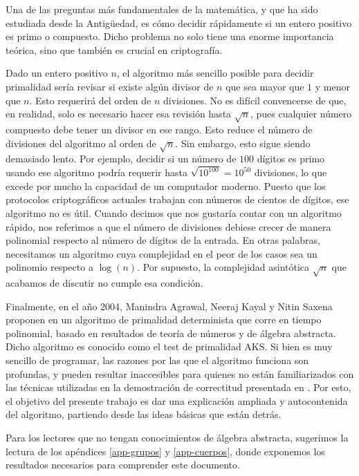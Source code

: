 Una de las preguntas más fundamentales de la matemática, y que ha sido estudiada desde la Antigüedad, es cómo decidir rápidamente si un entero positivo es primo o compuesto. Dicho problema no solo tiene una enorme importancia teórica, sino que también es crucial en criptografía.

Dado un entero positivo $n$, el algoritmo más sencillo posible para decidir primalidad sería revisar si existe algún divisor de $n$ que sea mayor que $1$ y menor que $n$. Esto requerirá del orden de $n$ divisiones. No es difícil convencerse de que, en realidad, solo es necesario hacer esa revisión hasta $\sqrt{n}$, pues cualquier número compuesto debe tener un divisor en ese rango. Esto reduce el número de divisiones del algoritmo al orden de $\sqrt{n}$. Sin embargo, esto sigue siendo demasiado lento. Por ejemplo, decidir si un número de $100$ dígitos es primo usando ese algoritmo podría requerir hasta $\sqrt{10^{100}} = 10^{50}$ divisiones, lo que excede por mucho la capacidad de un computador moderno. Puesto que los protocolos criptográficos actuales trabajan con números de cientos de dígitos, ese algoritmo no es útil. Cuando decimos que nos gustaría contar con un algoritmo rápido, nos referimos a que el número de divisiones debiese crecer de manera polinomial respecto al número de dígitos de la entrada. En otras palabras, necesitamos un algoritmo cuya complejidad en el peor de los casos sea un polinomio respecto a $\log(n)$. Por supuesto, la complejidad asintótica $\sqrt{n}$ que acabamos de discutir no cumple esa condición.



Finalmente, en el año 2004, Manindra Agrawal, Neeraj Kayal y Nitin Saxena proponen en \cite{AKS04} un algoritmo de primalidad determinista que corre en tiempo polinomial, basado en resultados de teorí­a de números y de álgebra abstracta. Dicho algoritmo es conocido como el test de primalidad AKS. Si bien es muy sencillo de programar, las razones por las que el algoritmo funciona son profundas, y pueden resultar inaccesibles para quienes no están familiarizados con las técnicas utilizadas en la demostración de correctitud presentada en \cite{AKS04}. Por esto, el objetivo del presente trabajo es dar una explicación ampliada y autocontenida del algoritmo, partiendo desde las ideas básicas que están detrás.

Para los lectores que no tengan conocimientos de álgebra abstracta, sugerimos la lectura de los apéndices \ref{app-grupos} y \ref{app-cuerpos}, donde exponemos los resultados necesarios para comprender este documento.
